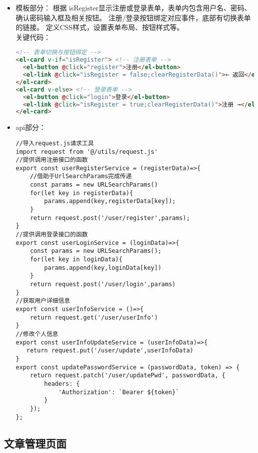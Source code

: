 \documentclass[bachelor]{thesis-uestc}
\begin{document}
\begin{itemize}
\item 模板部分：
根据 isRegister显示注册或登录表单，表单内包含用户名、密码、确认密码输入框及相关按钮。
注册/登录按钮绑定对应事件，底部有切换表单的链接。
定义CSS样式，设置表单布局、按钮样式等。
\\关键代码：
\begin{lstlisting}[language=html]
<!-- 表单切换与按钮绑定 -->
<el-card v-if="isRegister"> <!-- 注册表单 -->
  <el-button @click="register">注册</el-button>
  <el-link @click="isRegister = false;clearRegisterData()">← 返回</el-link>
</el-card>
<el-card v-else> <!-- 登录表单 -->
  <el-button @click="login">登录</el-button>
  <el-link @click="isRegister = true;clearRegisterData()">注册 →</el-link>
</el-card>
\end{lstlisting}
\item api部分：
\begin{lstlisting}
//导入request.js请求工具
import request from '@/utils/request.js'
//提供调用注册接口的函数
export const userRegisterService = (registerData)=>{
    //借助于UrlSearchParams完成传递
    const params = new URLSearchParams()
    for(let key in registerData){
        params.append(key,registerData[key]);
    }
    return request.post('/user/register',params);
}
//提供调用登录接口的函数
export const userLoginService = (loginData)=>{
    const params = new URLSearchParams();
    for(let key in loginData){
        params.append(key,loginData[key])
    }
    return request.post('/user/login',params)
}
//获取用户详细信息
export const userInfoService = ()=>{
    return request.get('/user/userInfo')
}
//修改个人信息
export const userInfoUpdateService = (userInfoData)=>{
   return request.put('/user/update',userInfoData)
}
export const updatePasswordService = (passwordData, token) => {
    return request.patch('/user/updatePwd', passwordData, {
        headers: {
            'Authorization': `Bearer ${token}`
        }
    });
};
\end{lstlisting}
\end{itemize}

\subsection{文章管理页面}
\end{document}
